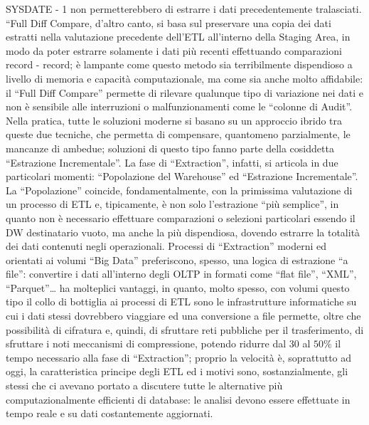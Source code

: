 \documentclass[a4paper,12pt]{report}
\begin{document}
SYSDATE - 1 non permetterebbero di estrarre i dati precedentemente tralasciati. “Full Diff Compare, d’altro canto, si basa sul preservare una copia dei dati estratti nella valutazione precedente dell’ETL all’interno della Staging Area, in modo da poter estrarre solamente i dati più recenti effettuando comparazioni record - record; è lampante come questo metodo sia terribilmente dispendioso a livello di memoria e capacità computazionale, ma come sia anche molto affidabile: il “Full Diff Compare” permette di rilevare qualunque tipo di variazione nei dati e non è sensibile alle interruzioni o malfunzionamenti come le “colonne di Audit”. Nella pratica, tutte le soluzioni moderne si basano su un approccio ibrido tra queste due tecniche, che permetta di compensare, quantomeno parzialmente, le mancanze di ambedue; soluzioni di questo tipo fanno parte della cosiddetta “Estrazione Incrementale”. La fase di “Extraction”, infatti, si articola in due particolari momenti: “Popolazione del Warehouse” ed “Estrazione Incrementale”. La “Popolazione” coincide, fondamentalmente, con la primissima valutazione di un processo di ETL e, tipicamente, è non solo l’estrazione “più semplice”, in quanto non è necessario effettuare comparazioni o selezioni particolari essendo il DW destinatario vuoto, ma anche la più dispendiosa, dovendo estrarre la totalità dei dati contenuti negli operazionali. Processi di “Extraction” moderni ed orientati ai volumi “Big Data” preferiscono, spesso, una logica di estrazione “a file”: convertire i dati all’interno degli OLTP in formati come “flat file”, “XML”, “Parquet”… ha molteplici vantaggi, in quanto, molto spesso, con volumi questo tipo il collo di bottiglia ai processi di ETL sono le infrastrutture informatiche su cui i dati stessi dovrebbero viaggiare ed una conversione a file permette, oltre che possibilità di cifratura e, quindi, di sfruttare reti pubbliche per il trasferimento, di sfruttare i noti meccanismi di compressione, potendo ridurre dal $30$ al $50\%$ il tempo necessario alla fase di “Extraction”; proprio la velocità è, soprattutto ad oggi, la caratteristica principe degli ETL ed i motivi sono, sostanzialmente, gli stessi che ci avevano portato a discutere tutte le alternative più computazionalmente efficienti di database: le analisi devono essere effettuate in tempo reale e su dati costantemente aggiornati.
\end{document}
